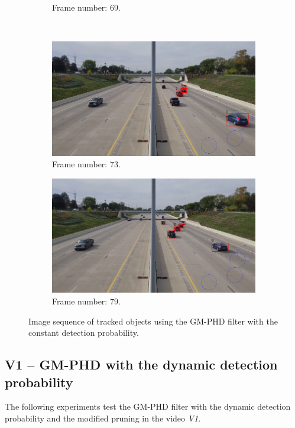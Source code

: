 \begin{figure}[H]
\begin{subfigure}{0.48\textwidth}
        \caption{Frame number: 69.}
        \label{fig:E1-V1-S0:06}
    \end{subfigure}
    \\
    \begin{subfigure}{0.48\textwidth}
        \centering
        \includegraphics[width=\linewidth]{../../../experiments/E1/V1/noPd/73}
        \caption{Frame number: 73.}
        \label{fig:E1-V1-S0:07}
    \end{subfigure}
    \begin{subfigure}{0.48\textwidth}
        \centering
        \includegraphics[width=\linewidth]{../../../experiments/E1/V1/noPd/79}
        \caption{Frame number: 79.}
        \label{fig:E1-V1-S0:08}
    \end{subfigure}
    \caption{Image sequence of tracked objects using the GM-PHD filter with the constant detection probability.}
    \label{fig:E1-V1-S0}
\end{figure}

\subsection{V1 -- GM-PHD with the dynamic detection probability}
The following experiments test the GM-PHD filter with the dynamic detection probability and the modified pruning in the
video \textit{V1}.
